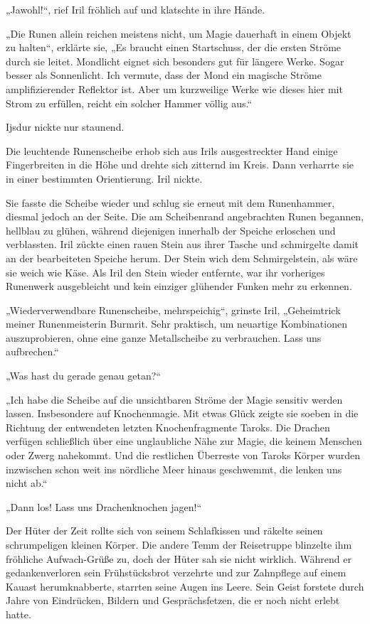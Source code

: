 „Jawohl!“, rief Iril fröhlich auf und klatschte in ihre Hände.

„Die Runen allein reichen meistens nicht, um Magie dauerhaft in einem Objekt zu halten“, erklärte sie, „Es braucht einen Startschuss, der die ersten Ströme durch sie leitet. Mondlicht eignet sich besonders gut für längere Werke. Sogar besser als Sonnenlicht. Ich vermute, dass der Mond ein magische Ströme amplifizierender Reflektor ist. Aber um kurzweilige Werke wie dieses hier mit Strom zu erfüllen, reicht ein solcher Hammer völlig aus.“

Ijsdur nickte nur staunend.

Die leuchtende Runenscheibe erhob sich aus Irils ausgestreckter Hand einige Fingerbreiten in die Höhe und drehte sich zitternd im Kreis. Dann verharrte sie in einer bestimmten Orientierung. Iril nickte.

Sie fasste die Scheibe wieder und schlug sie erneut mit dem Runenhammer, diesmal jedoch an der Seite. Die am Scheibenrand angebrachten Runen begannen, hellblau zu glühen, während diejenigen innerhalb der Speiche erloschen und verblassten. Iril zückte einen rauen Stein aus ihrer Tasche und schmirgelte damit an der bearbeiteten Speiche herum. Der Stein wich dem Schmirgelstein, als wäre sie weich wie Käse. Als Iril den Stein wieder entfernte, war ihr vorheriges Runenwerk ausgebleicht und kein einziger glühender Funken mehr zu erkennen.

„Wiederverwendbare Runenscheibe, mehrspeichig“, grinste Iril, „Geheimtrick meiner Runenmeisterin Burmrit. Sehr praktisch, um neuartige Kombinationen auszuprobieren, ohne eine ganze Metallscheibe zu verbrauchen. Lass uns aufbrechen.“

„Was hast du gerade genau getan?“

„Ich habe die Scheibe auf die unsichtbaren Ströme der Magie sensitiv werden lassen. Insbesondere auf Knochenmagie. Mit etwas Glück zeigte sie soeben in die Richtung der entwendeten letzten Knochenfragmente Taroks. Die Drachen verfügen schließlich über eine unglaubliche Nähe zur Magie, die keinem Menschen oder Zwerg nahekommt. Und die restlichen Überreste von Taroks Körper wurden inzwischen schon weit ins nördliche Meer hinaus geschwemmt, die lenken uns nicht ab.“

„Dann los! Lass uns Drachenknochen jagen!“\bigskip







Der Hüter der Zeit rollte sich von seinem Schlafkissen und räkelte seinen schrumpeligen kleinen Körper. Die andere Temm der Reisetruppe blinzelte ihm fröhliche Aufwach-Grüße zu, doch der Hüter sah sie nicht wirklich. Während er gedankenverloren sein Frühstücksbrot verzehrte und zur Zahnpflege auf einem Kauast herumknabberte, starrten seine Augen ins Leere. Sein Geist forstete durch Jahre von Eindrücken, Bildern und Gesprächsfetzen, die er noch nicht erlebt hatte.

